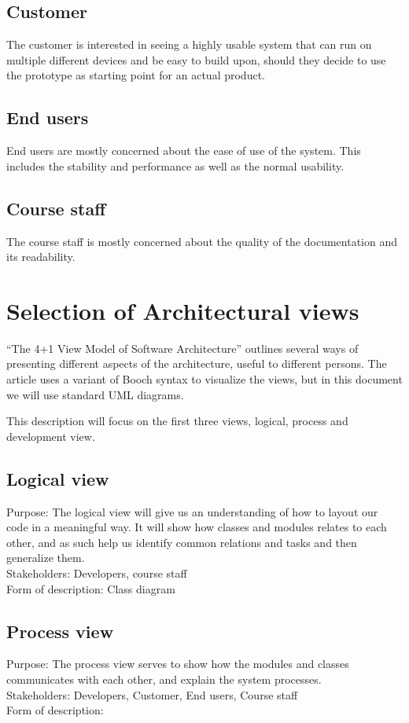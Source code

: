 \documentclass[11pt]{book}
\begin{document}
\subsection{Customer}
The customer is interested in seeing a highly usable system that can run on multiple different devices and be easy to build upon, should they decide to use the prototype as starting point for an actual product.

\subsection{End users}
End users are mostly concerned about the ease of use of the system. This includes the stability and performance as well as the normal usability.

\subsection{Course staff}
The course staff is mostly concerned about the quality of the documentation and its readability.

\section{Selection of Architectural views}
``The 4+1 View Model of Software Architecture'' \cite{Kruchten:1995:VMA:624610.625529} outlines several ways of presenting different aspects of the architecture, useful to different persons. The article uses a variant of Booch syntax to visualize the views, but in this document we will use standard UML diagrams.

This description will focus on the first three views, logical, process and development view.

\subsection{Logical view}
Purpose: The logical view will give us an understanding of how to layout our code in a meaningful way. It will show how classes and modules relates to each other, and as such help us identify common relations and tasks and then generalize them.\\
Stakeholders: Developers, course staff\\
Form of description: Class diagram

\subsection{Process view}
Purpose: The process view serves to show how the modules and classes communicates with each other, and explain the system processes.\\
Stakeholders: Developers, Customer, End users, Course staff\\
Form of description: 
\end{document}
